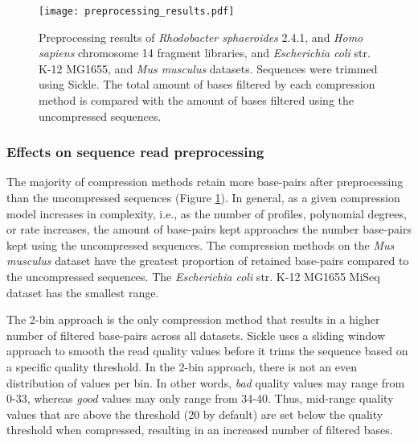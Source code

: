 \documentclass[12pt,\mydriver]{thesis}
\begin{document}
\begin{figure}[!htb]\begin{center}
\texttt{[image: preprocessing\_results.pdf]}
\end{center}
\renewcommand{\baselinestretch}{1}
\small\normalsize
\begin{quote}
\caption[Preprocessing results of \textit{Rhodobacter sphaeroides}
  2.4.1, and \textit{Homo sapiens} chromosome 14 fragment libraries,
  and \textit{Escherichia coli} str. K-12 MG1655, and \textit{Mus
    musculus} datasets]{Preprocessing results of \textit{Rhodobacter sphaeroides}
  2.4.1, and \textit{Homo sapiens} chromosome 14 fragment libraries,
  and \textit{Escherichia coli} str. K-12 MG1655, and \textit{Mus
    musculus} datasets. Sequences were trimmed using Sickle. The
  total amount of bases filtered by each compression method is
  compared with the amount of bases filtered using the uncompressed
  sequences.}
  \label{fig:preprocessing}
\end{quote}
\end{figure}
\renewcommand{\baselinestretch}{2}
\small\normalsize

\subsubsection{Effects on sequence read preprocessing}

The majority of compression methods retain more base-pairs after
preprocessing than the uncompressed sequences (Figure
\ref{fig:preprocessing}). In general, as a given compression model
increases in complexity, i.e., as the number of profiles, polynomial
degrees, or rate increases, the amount of base-pairs kept approaches
the number base-pairs kept using the uncompressed sequences. The
compression methods on the \textit{Mus musculus} dataset have the
greatest proportion of retained base-pairs compared to the
uncompressed sequences. The \textit{Escherichia coli} str. K-12
MG1655 MiSeq dataset has the smallest range.

The 2-bin approach is the only compression method that results in a
higher number of filtered base-pairs across all datasets. Sickle
uses a sliding window approach to smooth the read quality values before
it trims the sequence based on a specific quality threshold. In the
2-bin approach, there is not an even distribution of values per bin.
In other words, \emph{bad} quality values may range from 0-33, whereas
\emph{good} values may only range from 34-40. Thus, mid-range quality
values that are above the threshold (20 by default) are set below the
quality threshold when compressed, resulting in an increased number of
filtered bases.
\end{document}
